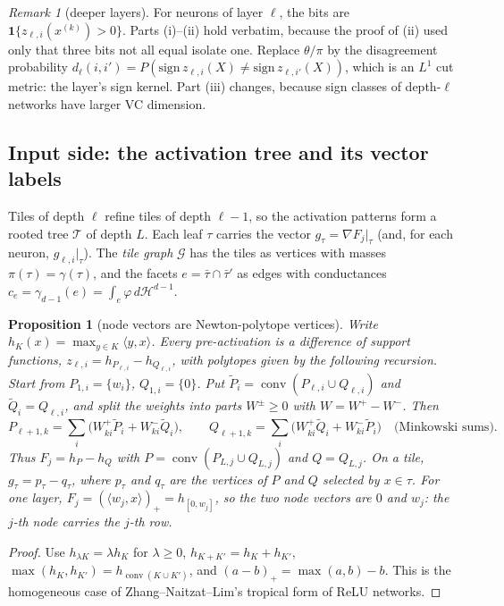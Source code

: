 \documentclass[11pt]{article}
\newtheorem{proposition}[theorem]{Proposition}
\theoremstyle{definition}
\theoremstyle{remark}
\newtheorem{remark}[theorem]{Remark}
\newcommand{\conv}{\operatorname{conv}}
\newcommand{\Hd}{\mathcal H^{d-1}}
\begin{document}
\begin{remark}[deeper layers]
For neurons of layer $\ell$, the bits are $\mathbf 1\{z_{\ell,i}(x^{(k)})>0\}$. Parts (i)--(ii) hold verbatim, because the proof of (ii) used only that three bits not all equal isolate one. Replace $\theta/\pi$ by the disagreement probability $d_\ell(i,i')=P(\mathrm{sign}\,z_{\ell,i}(X)\ne\mathrm{sign}\,z_{\ell,i'}(X))$, which is an $L^1$ cut metric: the layer's sign kernel. Part (iii) changes, because sign classes of depth-$\ell$ networks have larger VC dimension.
\end{remark}

\subsection{Input side: the activation tree and its vector labels}

Tiles of depth $\ell$ refine tiles of depth $\ell-1$, so the activation patterns form a rooted tree $\mathcal T$ of depth $L$. Each leaf $\tau$ carries the vector $g_\tau=\nabla F_j|_\tau$ (and, for each neuron, $g_{\ell,i}|_\tau$). The \emph{tile graph} $\mathcal G$ has the tiles as vertices with masses $\pi(\tau)=\gamma(\tau)$, and the facets $e=\bar\tau\cap\bar\tau'$ as edges with conductances $c_e=\gamma_{d-1}(e)=\int_e\varphi\,d\Hd$.

\begin{proposition}[node vectors are Newton-polytope vertices]\label{prop:newton}
Write $h_K(x)=\max_{y\in K}\langle y,x\rangle$. Every pre-activation is a difference of support functions, $z_{\ell,i}=h_{P_{\ell,i}}-h_{Q_{\ell,i}}$, with polytopes given by the following recursion. Start from $P_{1,i}=\{w_i\}$, $Q_{1,i}=\{0\}$. Put $\tilde P_i=\conv(P_{\ell,i}\cup Q_{\ell,i})$ and $\tilde Q_i=Q_{\ell,i}$, and split the weights into parts $W^\pm\ge0$ with $W=W^+-W^-$. Then
\[
P_{\ell+1,k}=\textstyle\sum_i\big(W^+_{ki}\tilde P_i+W^-_{ki}\tilde Q_i\big),\qquad Q_{\ell+1,k}=\sum_i\big(W^+_{ki}\tilde Q_i+W^-_{ki}\tilde P_i\big)\quad\text{(Minkowski sums)}.
\]
Thus $F_j=h_{P}-h_{Q}$ with $P=\conv(P_{L,j}\cup Q_{L,j})$ and $Q=Q_{L,j}$. On a tile, $g_\tau=p_\tau-q_\tau$, where $p_\tau$ and $q_\tau$ are the vertices of $P$ and $Q$ selected by $x\in\tau$. For one layer, $F_j=(\langle w_j,x\rangle)_+=h_{[0,w_j]}$, so the two node vectors are $0$ and $w_j$: the $j$-th node carries the $j$-th row.
\end{proposition}

\begin{proof}
Use $h_{\lambda K}=\lambda h_K$ for $\lambda\ge0$, $h_{K+K'}=h_K+h_{K'}$, $\max(h_K,h_{K'})=h_{\conv(K\cup K')}$, and $(a-b)_+=\max(a,b)-b$. This is the homogeneous case of Zhang--Naitzat--Lim's tropical form of ReLU networks.
\end{proof}
\end{document}
